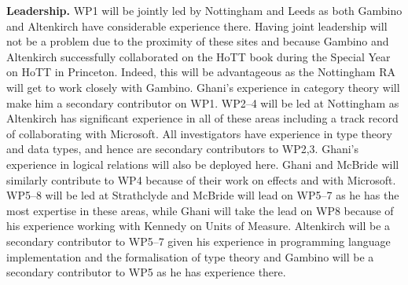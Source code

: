 \documentclass[a4paper,11pt]{article}
\begin{document}
{\bf Leadership.} WP1 will be jointly led by Nottingham and Leeds as
both Gambino and Altenkirch have considerable experience there. Having
joint leadership will not be a problem due to the proximity of these
sites and because Gambino and Altenkirch successfully collaborated on
the HoTT book during the Special Year on HoTT in Princeton. Indeed,
this will be advantageous as the Nottingham RA will get to work
closely with Gambino. Ghani's experience in category theory will make
him a secondary contributor on WP1. WP2--4 will be led at Nottingham
as Altenkirch has significant experience in all of these areas
including a track record of collaborating with Microsoft. All
investigators have experience in type theory and data types, and hence
are secondary contributors to WP2,3. Ghani's experience in logical
relations will also be deployed here. Ghani and McBride will similarly
contribute to WP4 because of their work on effects and with
Microsoft. WP5--8 will be led at Strathclyde and McBride will 
lead on WP5--7 as he has the most expertise in these areas, while Ghani
will take the lead on WP8 because of his experience working with
Kennedy on Units of Measure. Altenkirch will be a secondary
contributor to WP5--7 given his experience in programming language
implementation and the formalisation of type theory and Gambino will
be a secondary contributor to WP5 as he has experience there.
\end{document}
